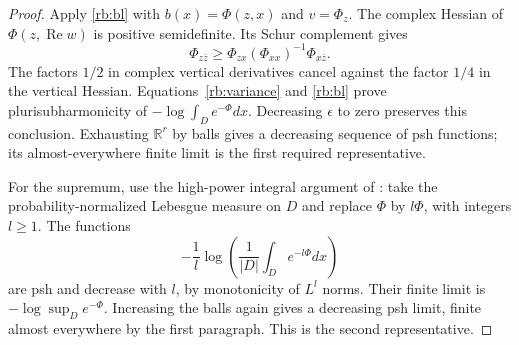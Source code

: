 \begin{proof}
Apply \eqref{rb:bl} with $b(x)=\Phi(z,x)$ and $v=\Phi_z$.  The complex Hessian of
$\Phi(z,\operatorname{Re}w)$ is positive semidefinite.  Its Schur
complement gives
\[
         \Phi_{z\bar z}\geq
         \Phi_{zx}(\Phi_{xx})^{-1}\Phi_{x\bar z}.
\]
The factors $1/2$ in complex vertical derivatives cancel against the
factor $1/4$ in the vertical Hessian.  Equations~\eqref{rb:variance}
and \eqref{rb:bl} prove plurisubharmonicity of
$-\log\int_D e^{-\Phi}dx$.  Decreasing $\epsilon$ to zero preserves
this conclusion.  Exhausting $\mathbb R^r$ by balls gives a decreasing
sequence of psh functions; its almost-everywhere finite limit is the
first required representative.

For the supremum, use the high-power integral argument of
\cite[p.~1635, following Theorem~1.2]{Berndtsson2006}: take the
probability-normalized Lebesgue measure on $D$ and replace $\Phi$ by
$l\Phi$, with integers $l\geq1$. The functions
\[
       -\frac1l\log\left(\frac1{|D|}\int_D e^{-l\Phi}dx\right)
\]
are psh and decrease with $l$, by monotonicity of $L^l$ norms.  Their
finite limit is $-\log\sup_D e^{-\Phi}$.  Increasing the balls again
gives a decreasing psh limit, finite almost everywhere by the first
paragraph.  This is the second representative.
\end{proof}

